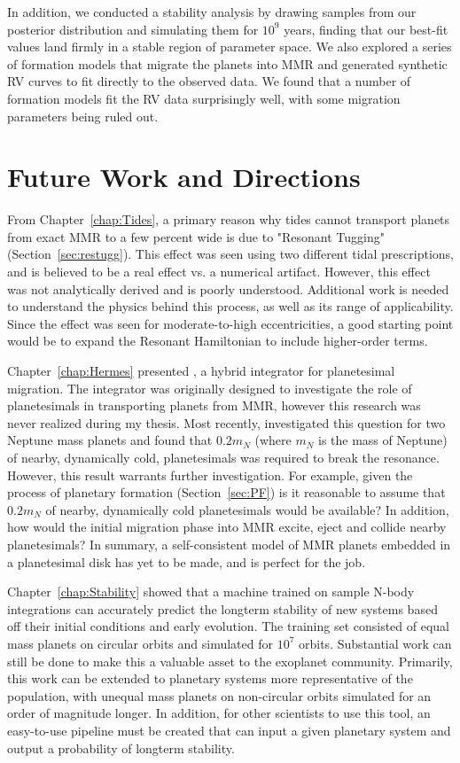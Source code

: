 In addition, we conducted a stability analysis by drawing samples from our posterior distribution and simulating them for $10^9$ years, finding that our best-fit values land firmly in a stable region of parameter space.
We also explored a series of formation models that migrate the planets into MMR and generated synthetic RV curves to fit directly to the observed data. 
We found that a number of formation models fit the RV data surprisingly well, with some migration parameters being ruled out.
\fi

\section{Future Work and Directions}
\label{sec:Future}
From Chapter~\ref{chap:Tides}, a primary reason why tides cannot transport planets from exact MMR to a few percent wide is due to "Resonant Tugging" (Section~\ref{sec:restugg}).
This effect was seen using two different tidal prescriptions, and is believed to be a real effect vs. a numerical artifact. 
However, this effect was not analytically derived and is poorly understood. 
Additional work is needed to understand the physics behind this process, as well as its range of applicability.
Since the effect was seen for moderate-to-high eccentricities, a good starting point would be to expand the Resonant Hamiltonian to include higher-order terms. 

Chapter~\ref{chap:Hermes} presented \hermes, a hybrid integrator for planetesimal migration. 
The integrator was originally designed to investigate the role of planetesimals in transporting planets from MMR, however this research was never realized during my thesis. 
Most recently, \citet{Chatterjee2015} investigated this question for two Neptune mass planets and found that $0.2m_N$ (where $m_N$ is the mass of Neptune) of nearby, dynamically cold, planetesimals was required to break the resonance. 
However, this result warrants further investigation. 
For example, given the process of planetary formation (Section~\ref{sec:PF}) is it reasonable to assume that $0.2m_N$ of nearby, dynamically cold planetesimals would be available?
In addition, how would the initial migration phase into MMR excite, eject and collide nearby planetesimals?
In summary, a self-consistent model of MMR planets embedded in a planetesimal disk has yet to be made, and \hermes is perfect for the job.

Chapter~\ref{chap:Stability} showed that a machine trained on sample N-body integrations can accurately predict the longterm stability of new systems based off their initial conditions and early evolution. 
The training set consisted of equal mass planets on circular orbits and simulated for $10^7$ orbits. 
Substantial work can still be done to make this a valuable asset to the exoplanet community.
Primarily, this work can be extended to planetary systems more representative of the \kep population, with unequal mass planets on non-circular orbits simulated for an order of magnitude longer. 
In addition, for other scientists to use this tool, an easy-to-use pipeline must be created that can input a given planetary system and output a probability of longterm stability. 

